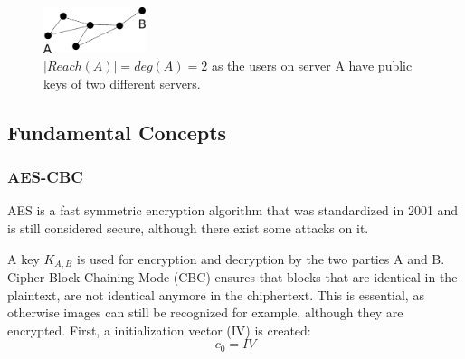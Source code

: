 \documentclass{scrartcl}
\begin{document}
\begin{figure}[ht]
	\centering
    \includegraphics[width=30mm]{illustrations/graph.pdf}

	\caption{$|Reach(A)| = deg(A) = 2
$ as the users on server A have public keys of two different servers. }
	\label{figContextGraph}
\end{figure}





 
\subsection{Fundamental Concepts}
\subsubsection{AES-CBC \label{AESCBC}}
AES is a fast symmetric encryption algorithm that was standardized in 2001 and is still considered secure, although there exist some attacks on it.

A key $K_{A,B}$ is used for encryption and decryption by the two parties A and B. 
Cipher Block Chaining Mode (CBC) ensures that blocks that are identical in the plaintext, are not identical anymore in the chiphertext. This is essential, as otherwise images can still be recognized for example, although they are encrypted. First, a initialization vector (IV) is created:
$$
c_0 = IV
$$
\end{document}

